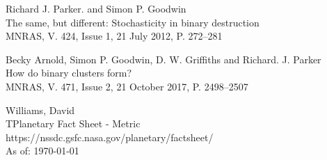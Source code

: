 \documentclass[a4paper,10pt]{article}
\begin{document}
\begin{thebibliography}{9}
Richard J. Parker. and Simon P. Goodwin\\
The same, but different: Stochasticity in binary destruction\\
MNRAS, V. 424, Issue 1, 21 July 2012, P. 272--281

Becky Arnold, Simon P. Goodwin, D. W. Griffiths and Richard. J. Parker\\
How do binary clusters form?\\
MNRAS, V. 471, Issue 2, 21 October 2017, P. 2498--2507

Williams, David\\
TPlanetary Fact Sheet - Metric\\
https://nssdc.gsfc.nasa.gov/planetary/factsheet/\\ As of: \today

\end{thebibliography}
\end{document}
